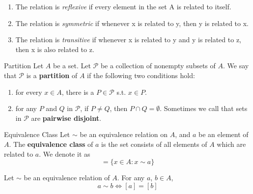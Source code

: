 \begin{remarks}
  \begin{enumerate}

    \item The relation is \textit{reflexive} if every element in the
      set A is related to itself.
    \item The relation is \textit{symmetric} if whenever x is related
      to y, then y is related to x.
    \item The relation is \textit{transitive} if whenever x is
      related to y and y is related to z, then x is also related to z.

  \end{enumerate}
\end{remarks}

\begin{definition}{Partition}{}
  Let $A$ be a set. Let $\mathcal{P}$ be a collection of nonempty
  subsets of $A$. We say that $\mathcal{P}$ is a \textbf{partition}
  of $A$ if the following two conditions hold:
  \begin{enumerate}

    \item for every $x \in A$, there is a $P \in \mathcal{P}$ s.t. $x \in P$.
    \item for any $P$ and $Q$ in $\mathcal{P}$, if $P \neq Q$, then
      $P \cap Q = \emptyset$. Sometimes we call that sets in
      $\mathcal{P}$ are \textbf{pairwise disjoint}.

  \end{enumerate}
\end{definition}

\begin{definition}{Equivalence Class}{}
  Let $\sim$ be an equivalence relation on $A$, and $a$ be an element
  of $A$. The \textbf{equivalence class} of $a$ is the set consists
  of all elements of $A$ which are related to $a$. We denote it as
  \begin{equation*}
    [a] = \{x \in A: x \sim a\}
  \end{equation*}
\end{definition}

\begin{theorem}{}{}
  Let $\sim$ be an equivalence relation of $A$. For any $a$, $b \in A$,
  \begin{equation*}
    a \sim b \iff [a] = [b]
  \end{equation*}
\end{theorem}

